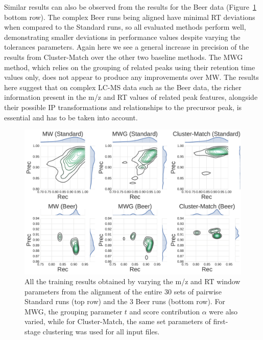Similar results can also be observed from the results for the Beer data (Figure~\ref{fig:02} bottom row). The complex Beer runs being aligned have minimal RT deviations when compared to the Standard runs, so all evaluated methods perform well, demonstrating smaller deviations in performance values despite varying the tolerances parameters. Again here we see a general increase in precision of the results from Cluster-Match over the other two baseline methods. The MWG method, which relies on the grouping of related peaks using their retention time values only, does not appear to produce any improvements over MW. The results here suggest that on complex LC-MS data such as the Beer data, the richer information present in the m/z and RT values of related peak features, alongside their possible IP transformations and relationships to the precursor peak, is essential and has to be taken into account.

\begin{figure}[!htbp]
\centering\includegraphics[width=1.0\linewidth]{06-precursor-cluster/figures/fig2.pdf}
\centering\caption{\label{fig:02} All the training results obtained by varying the m/z and RT window parameters from the alignment of the entire 30 sets of pairwise Standard runs (top row) and the 3 Beer runs (bottom row). For MWG, the grouping parameter $t$ and score contribution $\alpha$ were also varied, while for Cluster-Match, the same set parameters of first-stage clustering was used for all input files.}
\end{figure}

